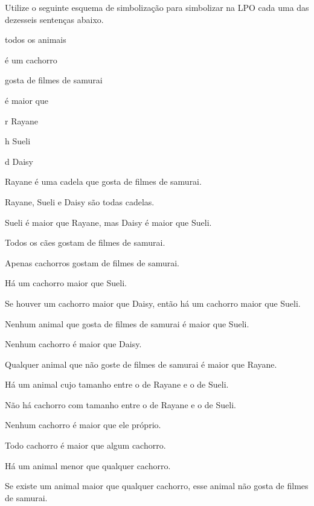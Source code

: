 \problempart 
Utilize o seguinte esquema de simbolização para simbolizar na LPO cada uma das dezesseis sentenças abaixo.
\begin{center}
\begin{ekey}
\item[\text{domínio}] todos os animais
\item[\atom{C}{x}]  é um cachorro
\item[\atom{S}{x}]  gosta de filmes de samurai
\item[\atom{M}{x,y}]  é maior que 
\item[r] Rayane
\item[h] Sueli
\item[d] Daisy
\end{ekey}
\end{center}
\begin{earg}
\item Rayane é uma cadela que gosta de filmes de samurai.
\item Rayane, Sueli e Daisy são todas cadelas.
\item Sueli é maior que Rayane, mas Daisy é maior que Sueli.
\item Todos os cães gostam de filmes de samurai.
\item Apenas cachorros gostam de filmes de samurai.
\item Há um cachorro maior que Sueli.
\item Se houver um cachorro maior que Daisy, então há um cachorro maior que Sueli.
\item Nenhum animal que gosta de filmes de samurai é maior que Sueli.
\item Nenhum cachorro é maior que Daisy.
\item Qualquer animal que não goste de filmes de samurai é maior que Rayane.
\item Há um animal cujo tamanho entre o de Rayane e o de Sueli.
\item Não há cachorro com tamanho entre o de Rayane e o de Sueli.
\item Nenhum cachorro é maior que ele próprio.
\item Todo cachorro é maior que algum cachorro.
\item Há um animal menor que qualquer cachorro.
\item Se existe um animal maior que qualquer cachorro, esse animal não gosta de filmes de samurai.\end{earg}

